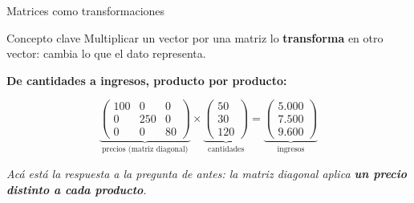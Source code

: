 \documentclass[aspectratio=169,10pt]{beamer}
\begin{document}
\begin{frame}{Matrices como transformaciones}

\begin{block}{Concepto clave}
Multiplicar un vector por una matriz lo \textbf{transforma} en otro vector: cambia lo que el dato
representa.
\end{block}

\vspace{0.3cm}
\textbf{De cantidades a ingresos, producto por producto:}

$$\underbrace{\begin{pmatrix} 100 & 0 & 0 \\ 0 & 250 & 0 \\ 0 & 0 & 80 \end{pmatrix}}_{\text{precios (matriz diagonal)}}
\times
\underbrace{\begin{pmatrix} 50 \\ 30 \\ 120 \end{pmatrix}}_{\text{cantidades}}
=
\underbrace{\begin{pmatrix} 5.000 \\ 7.500 \\ 9.600 \end{pmatrix}}_{\text{ingresos}}$$

\vspace{0.3cm}
\begin{center}
\textit{Acá está la respuesta a la pregunta de antes: la matriz diagonal aplica \textbf{un precio
distinto a cada producto}.}
\end{center}
\end{frame}
\end{document}
